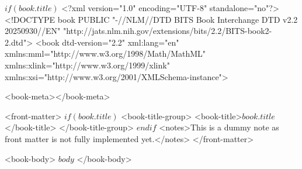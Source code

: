 $if(book.title)$
    <?xml version="1.0" encoding="UTF-8" standalone="no"?>
    <!DOCTYPE book PUBLIC "-//NLM//DTD BITS Book Interchange DTD v2.2 20250930//EN" "http://jats.nlm.nih.gov/extensions/bits/2.2/BITS-book2-2.dtd">
    <book
        dtd-version="2.2" xml:lang="en" 
        xmlns:mml="http://www.w3.org/1998/Math/MathML" 
        xmlns:xlink="http://www.w3.org/1999/xlink" 
        xmlns:xsi="http://www.w3.org/2001/XMLSchema-instance">

        <book-meta></book-meta>

        <front-matter>
            $if(book.title)$
                <book-title-group>
                    <book-title>$book.title$</book-title>
                </book-title-group>
            $endif$
            <notes>This is a dummy note as front matter is not fully implemented yet.</notes>
        </front-matter>

        <book-body>
            $body$
        </book-body>


